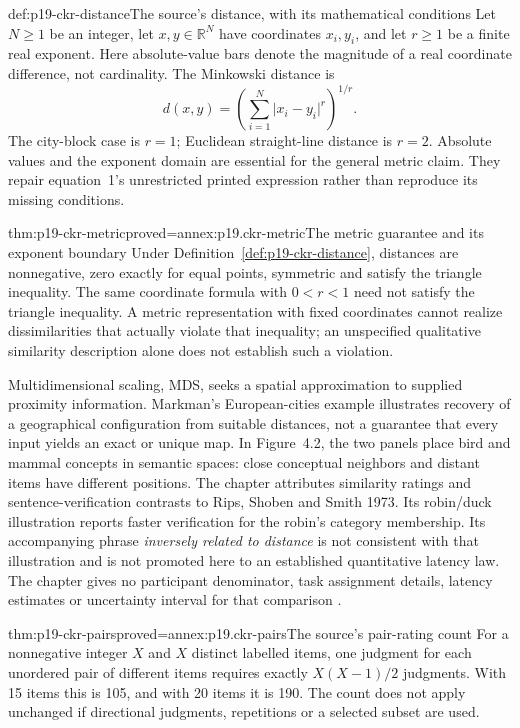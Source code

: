 \begin{hbdefinition}{def:p19-ckr-distance}{The source's distance, with its mathematical conditions}
Let \(N\geq1\) be an integer, let \(x,y\in\mathbb R^N\)
have coordinates \(x_i,y_i\), and let \(r\geq1\) be a finite
real exponent. Here absolute-value bars denote the magnitude of a
real coordinate difference, not cardinality. The Minkowski distance is
\[
 d(x,y)=\left(\sum_{i=1}^N \lvert x_i-y_i\rvert^r\right)^{1/r}.
\]
The city-block case is \(r=1\); Euclidean straight-line distance
is \(r=2\). Absolute values and the exponent domain are essential
for the general metric claim. They repair equation~1's unrestricted
printed expression rather than reproduce its missing conditions.
\end{hbdefinition}

\begin{hbtheorem}{thm:p19-ckr-metric}{proved=annex:p19.ckr-metric}{The metric guarantee and its exponent boundary}
Under Definition~\ref{def:p19-ckr-distance}, distances are nonnegative,
zero exactly for equal points, symmetric and satisfy the triangle
inequality. The same coordinate formula with \(0<r<1\) need
not satisfy the triangle inequality. A metric representation with
fixed coordinates cannot realize dissimilarities that actually violate
that inequality; an unspecified qualitative similarity description
alone does not establish such a violation.
\end{hbtheorem}

Multidimensional scaling, MDS, seeks a spatial approximation to
supplied proximity information. Markman's European-cities example
illustrates recovery of a geographical configuration from suitable
distances, not a guarantee that every input yields an exact or
unique map. In Figure~4.2, the two panels place bird and mammal
concepts in semantic spaces: close conceptual neighbors and distant
items have different positions. The chapter attributes similarity
ratings and sentence-verification contrasts to Rips, Shoben and
Smith 1973. Its robin/duck illustration reports faster verification
for the robin's category membership. Its accompanying phrase
\emph{inversely related to distance} is not consistent with that
illustration and is not promoted here to an established quantitative
latency law. The chapter gives no participant denominator, task
assignment details, latency estimates or uncertainty interval for
that comparison \cite[pp.~40--41]{Markman2012CognitiveRepresentation}.

\begin{hbtheorem}{thm:p19-ckr-pairs}{proved=annex:p19.ckr-pairs}{The source's pair-rating count}
For a nonnegative integer \(X\) and \(X\) distinct labelled items,
one judgment for each
unordered pair of different items requires exactly
\(X(X-1)/2\) judgments. With 15 items this is 105, and with
20 items it is 190. The count does not apply unchanged if
directional judgments, repetitions or a selected subset are used.
\end{hbtheorem}

